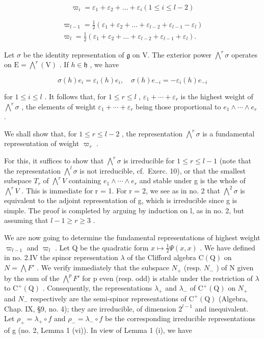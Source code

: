 \[
\varpi_ {i} = \varepsilon_ {1} + \varepsilon_ {2} + \dots + \varepsilon_ {i} (1 \leq i \leq l - 2)
\]

\[
\begin{array}{c} \varpi_ {l - 1} = \frac {1}{2} (\varepsilon_ {1} + \varepsilon_ {2} + \ldots + \varepsilon_ {l - 2} + \varepsilon_ {l - 1} - \varepsilon_ {l}) \\ \varpi_ {l} = \frac {1}{2} (\varepsilon_ {1} + \varepsilon_ {2} + \ldots + \varepsilon_ {l - 2} + \varepsilon_ {l - 1} + \varepsilon_ {l}). \end{array}
\]

Let \(\sigma\) be the identity representation of \(\mathfrak{g}\) on V. The exterior power \(\bigwedge^{r}\sigma\) operates on \(\mathrm{E} = \bigwedge^{r}(\mathrm{V})\) . If \(h\in \mathfrak{h}\) , we have

\[
\sigma (h) e _ {i} = \varepsilon_ {i} (h) e _ {i}, \quad \sigma (h) e _ {- i} = - \varepsilon_ {i} (h) e _ {- i}
\]

for \(1 \leq i \leq l\) . It follows that, for \(1 \leq r \leq l\) , \(\varepsilon_{1} + \cdots + \varepsilon_{r}\) is the highest weight of \(\bigwedge^{r} \sigma\) , the elements of weight \(\varepsilon_{1} + \cdots + \varepsilon_{r}\) being those proportional to \(e_{1} \wedge \cdots \wedge e_{r}\) .

We shall show that, for \(1 \leq r \leq l - 2\) , the representation \(\bigwedge^{r} \sigma\) is a fundamental representation of weight \(\varpi_{r}\) .

For this, it suffices to show that \(\bigwedge^{r}\sigma\) is irreducible for \(1 \leq r \leq l - 1\) (note that the representation \(\bigwedge^{l}\sigma\) is not irreducible, cf.~Exerc. 10), or that the smallest subspace \(T_{r}\) of \(\bigwedge^{r}V\) containing \(e_{1} \wedge \cdots \wedge e_{r}\) and stable under g is the whole of \(\bigwedge^{r}V\) . This is immediate for r = 1. For r = 2, we see as in no. 2 that \(\bigwedge^{2}\sigma\) is equivalent to the adjoint representation of g, which is irreducible since g is simple. The proof is completed by arguing by induction on l, as in no. 2, but assuming that \(l - 1 \geq r \geq 3\) .

We are now going to determine the fundamental representations of highest weight \(\varpi_{l-1}\) and \(\varpi_{l}\) . Let Q be the quadratic form \(x \mapsto \frac{1}{2}\Psi(x, x)\) . We have defined in no. 2.IV the spinor representation \(\lambda\) of the Clifford algebra \(\mathrm{C}(\mathrm{Q})\) on \(N = \bigwedge F'\) . We verify immediately that the subspace \(N_{+}\) (resp. \(N_{-}\) ) of N given by the sum of the \(\bigwedge^{p}F'\) for p even (resp. odd) is stable under the restriction of \(\lambda\) to \(\mathrm{C}^{+}(\mathrm{Q})\) . Consequently, the representations \(\lambda_{+}\) and \(\lambda_{-}\) of \(\mathrm{C}^{+}(\mathrm{Q})\) on \(N_{+}\) and \(N_{-}\) respectively are the semi-spinor representations of \(\mathrm{C}^{+}(\mathrm{Q})\) (Algebra, Chap. IX, §9, no. 4); they are irreducible, of dimension \(2^{l-1}\) and inequivalent. Let \(\rho_{+} = \lambda_{+} \circ f\) and \(\rho_{-} = \lambda_{-} \circ f\) be the corresponding irreducible representations of g (no. 2, Lemma 1 (vi)). In view of Lemma 1 (i), we have

